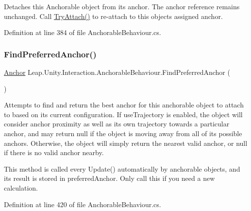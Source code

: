 Detaches this Anchorable object from its anchor. The anchor reference remains unchanged. Call \mbox{\hyperlink{class_leap_1_1_unity_1_1_interaction_1_1_anchorable_behaviour_acf8928aca2c223daa30c8650564b9ab0}{Try\+Attach()}} to re-\/attach to this object\textquotesingle{}s assigned anchor. 



Definition at line 384 of file Anchorable\+Behaviour.\+cs.

\mbox{\label{class_leap_1_1_unity_1_1_interaction_1_1_anchorable_behaviour_a1ec7edef87a35f76a8ffc601ce1b615a}} 
\subsubsection{\texorpdfstring{FindPreferredAnchor()}{FindPreferredAnchor()}}
{\footnotesize\ttfamily \mbox{\hyperlink{class_leap_1_1_unity_1_1_interaction_1_1_anchor}{Anchor}} Leap.\+Unity.\+Interaction.\+Anchorable\+Behaviour.\+Find\+Preferred\+Anchor (\begin{DoxyParamCaption}{ }\end{DoxyParamCaption})}



Attempts to find and return the best anchor for this anchorable object to attach to based on its current configuration. If use\+Trajectory is enabled, the object will consider anchor proximity as well as its own trajectory towards a particular anchor, and may return null if the object is moving away from all of its possible anchors. Otherwise, the object will simply return the nearest valid anchor, or null if there is no valid anchor nearby. 

This method is called every Update() automatically by anchorable objects, and its result is stored in preferred\+Anchor. Only call this if you need a new calculation. 

Definition at line 420 of file Anchorable\+Behaviour.\+cs.

\mbox{\label{class_leap_1_1_unity_1_1_interaction_1_1_anchorable_behaviour_a72020fda147a7ba0a31c30e4b8d03b7f}} 
